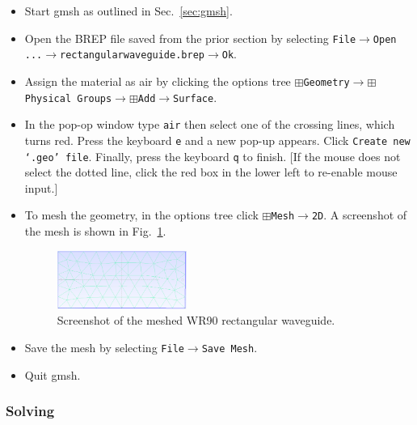 \documentclass[titlepage]{article}
\renewcommand\_{\textunderscore\linebreak[1]}
\begin{document}
\begin{itemize}
\item Start gmsh as outlined in Sec.~\ref{sec:gmsh}.
\item Open the BREP file saved from the prior section by selecting \newline \texttt{File}$\rightarrow$\texttt{Open ...}$\rightarrow$\texttt{rectangular\_waveguide.brep}$\rightarrow$\texttt{Ok}.
\item Assign the material as air by clicking the options tree \newline$\boxplus$\texttt{Geometry}$\rightarrow$$\boxplus$\texttt{Physical Groups}$\rightarrow$$\boxplus$\texttt{Add}$\rightarrow$\texttt{Surface}.
\item In the pop-op window type \texttt{air} then select one of the crossing lines, which turns red.  Press the keyboard \texttt{e} and a new pop-up appears.  Click \texttt{Create new `.geo' file}.  Finally, press the keyboard \texttt{q} to finish.  [If the mouse does not select the dotted line, click the red box in the lower left to re-enable mouse input.]
\item To mesh the geometry, in the options tree click $\boxplus$\texttt{Mesh}$\rightarrow$\texttt{2D}. A screenshot of the mesh is shown in Fig.~\ref{fig:rectangular_mesh}.
\begin{figure}
  \centering
  \includegraphics[width=0.4\textwidth]{../tutorials/OpenParEM2D/rectangular_waveguide/screenshots/rectangular_mesh}
  \caption{Screenshot of the meshed WR90 rectangular waveguide.}
  \label{fig:rectangular_mesh}
\end{figure}
\item Save the mesh by selecting \texttt{File}$\rightarrow$\texttt{Save Mesh}.
\item Quit gmsh.
\end{itemize}

\subsubsection{Solving}
\end{document}
